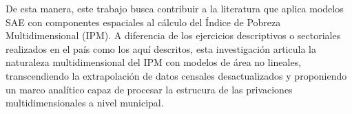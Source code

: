 De esta manera, este trabajo busca contribuir a la literatura que aplica modelos SAE con componentes espaciales al cálculo del Índice de Pobreza Multidimensional (IPM). A diferencia de los ejercicios descriptivos o sectoriales realizados en el país como los aquí descritos, esta investigación articula la naturaleza multidimensional del IPM con modelos de área no lineales, transcendiendo la extrapolación de datos censales desactualizados y proponiendo un marco analítico capaz de procesar la estrucura de las privaciones multidimensionales a nivel municipal.